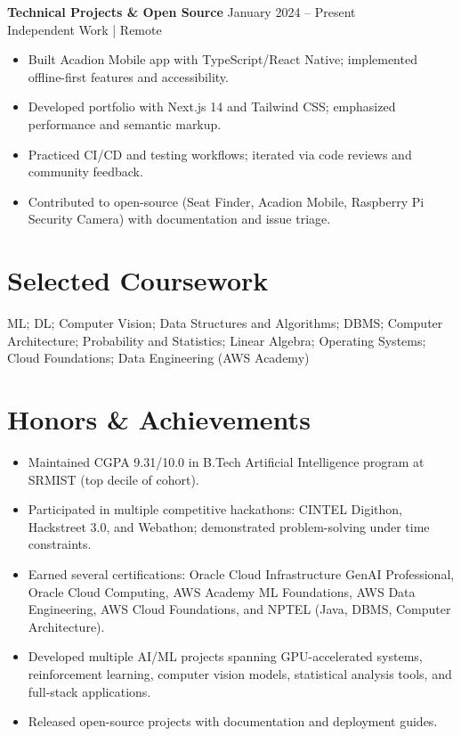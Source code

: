 \documentclass[10pt,a4paper]{article}
\newcommand{\sect}[1]{\vspace{6pt}\section*{#1}\vspace{-2pt}}
\begin{document}
\textbf{Technical Projects \& Open Source} \hfill January 2024 -- Present\\
Independent Work \;|\; Remote\\
\begin{itemize}
  \item Built Acadion Mobile app with TypeScript/React Native; implemented offline-first features and accessibility.
  \item Developed portfolio with Next.js 14 and Tailwind CSS; emphasized performance and semantic markup.
  \item Practiced CI/CD and testing workflows; iterated via code reviews and community feedback.
  \item Contributed to open-source (Seat Finder, Acadion Mobile, Raspberry Pi Security Camera) with documentation and issue triage.
\end{itemize}

\sect{Selected Coursework}

ML; DL; Computer Vision; Data Structures and Algorithms; DBMS; Computer Architecture; Probability and Statistics; Linear Algebra; Operating Systems; Cloud Foundations; Data Engineering (AWS Academy)


\sect{Honors \& Achievements}

\begin{itemize}
  \item Maintained CGPA 9.31/10.0 in B.Tech Artificial Intelligence program at SRMIST (top decile of cohort).
  \item Participated in multiple competitive hackathons: CINTEL Digithon, Hackstreet 3.0, and Webathon; demonstrated problem-solving under time constraints.
  \item Earned several certifications: Oracle Cloud Infrastructure GenAI Professional, Oracle Cloud Computing, AWS Academy ML Foundations, AWS Data Engineering, AWS Cloud Foundations, and NPTEL (Java, DBMS, Computer Architecture).
  \item Developed multiple AI/ML projects spanning GPU-accelerated systems, reinforcement learning, computer vision models, statistical analysis tools, and full-stack applications.
  \item Released open-source projects with documentation and deployment guides.
\end{itemize}
\end{document}
